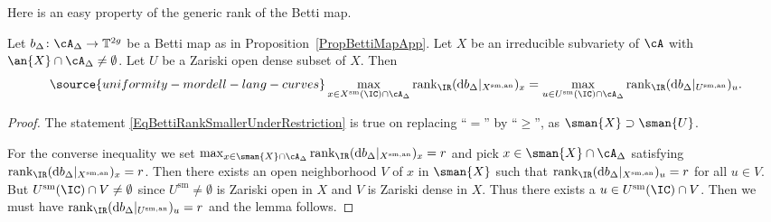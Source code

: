Here is an easy property of the generic rank of the Betti map.
\begin{lemma}
\notready\label{LemmaBettiRankZarOpenApp}
Let $b_{\Delta} \colon \cA_{\Delta} \rightarrow \mathbb T^{2g}$ be a Betti map as in Proposition~\ref{PropBettiMapApp}.
Let $X$ be an irreducible subvariety of $\cA$ with $\an{X}\cap\cA_\Delta\not=\emptyset$. Let $U$ be a Zariski open dense subset of $X$. Then
\begin{equation}\label{EqBettiRankSmallerUnderRestriction}
\source{uniformity-mordell-lang-curves}
\max_{x \in X^{\mathrm{sm}}(\IC) \cap \cA_{\Delta}} \mathrm{rank}_{\IR} (\mathrm{d}b_{\Delta}|_{X^{\mathrm{sm,an}}})_x = \max_{u \in U^{\mathrm{sm}}(\IC) \cap \cA_{\Delta}} \mathrm{rank}_{\IR} (\mathrm{d}b_{\Delta}|_{U^{\mathrm{sm,an}}})_u.
\end{equation}
\end{lemma}
\begin{proof}
The statement \eqref{EqBettiRankSmallerUnderRestriction} is true on
replacing ``$=$'' by  ``$\ge$'', as
 $\sman{X}\supset \sman{U}$.

For the converse inequality we set
 $\max_{x \in \sman{X} \cap \cA_{\Delta}} \mathrm{rank}_{\IR} (\mathrm{d}b_{\Delta}|_{X^{\mathrm{sm,an}}})_x  = r$
and pick
 $x \in \sman{X} \cap \cA_{\Delta}$ satisfying
$\mathrm{rank}_{\IR} (\mathrm{d}b_{\Delta}|_{X^{\mathrm{sm,an}}})_x =
r$. Then there exists an open neighborhood  $V$ of $x$ in
$\sman{X}$ such that $\mathrm{rank}_{\IR}
(\mathrm{d}b_{\Delta}|_{X^{\mathrm{sm,an}}})_u = r$ for all $u \in
V$. But $U^{\mathrm{sm}}(\IC) \cap V \not= \emptyset$ since
$U^{\mathrm{sm}}\not=\emptyset$ is Zariski open in $X$ and $V$ is Zariski dense
in $X$. Thus there exists a $u \in U^{\mathrm{sm}}(\IC) \cap V$. Then
we must have $\mathrm{rank}_{\IR}
(\mathrm{d}b_{\Delta}|_{U^{\mathrm{sm,an}}})_u = r$ and the lemma
follows.
\end{proof}


